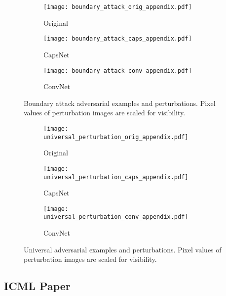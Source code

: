 \begin{figure}
	\centering
	
	\begin{subfigure}{.23\textwidth}
		\centering
		\texttt{[image: boundary\_attack\_orig\_appendix.pdf]}%
		\caption{Original}%
	\end{subfigure}%
	\begin{subfigure}{.36\textwidth}
		\centering
		\texttt{[image: boundary\_attack\_caps\_appendix.pdf]}%
		\caption{CapsNet}
	\end{subfigure}%
	\begin{subfigure}{.36\textwidth}
		\centering
		\texttt{[image: boundary\_attack\_conv\_appendix.pdf]}%
		\caption{ConvNet}
	\end{subfigure}
	\caption[Boundary attack adversarial examples]{Boundary attack adversarial examples and perturbations. Pixel values of perturbation images are scaled for visibility.}
	\label{fig:boundary-img}
	
\end{figure}

\begin{figure}
	\centering
	
	\begin{subfigure}{.23\textwidth}
		\centering
		\texttt{[image: universal\_perturbation\_orig\_appendix.pdf]}%
		\caption{Original}%
	\end{subfigure}%
	\begin{subfigure}{.36\textwidth}
		\centering
		\texttt{[image: universal\_perturbation\_caps\_appendix.pdf]}%
		\caption{CapsNet}
	\end{subfigure}%
	\begin{subfigure}{.36\textwidth}
		\centering
		\texttt{[image: universal\_perturbation\_conv\_appendix.pdf]}%
		\caption{ConvNet}
	\end{subfigure}
	\caption[Universal adversarial examples]{Universal adversarial examples and perturbations. Pixel values of perturbation images are scaled for visibility.}
	\label{fig:universal-img}
	
\end{figure}

\subsection{ICML Paper}

